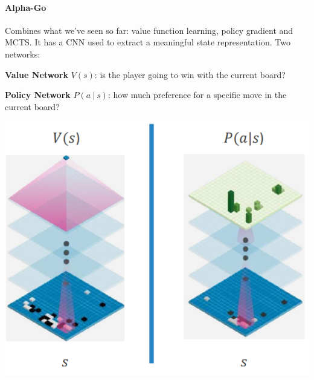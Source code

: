 \documentclass[10pt]{report}
\begin{document}
\paragraph{Alpha-Go} Combines what we've seen so far: value function learning, policy gradient and MCTS. It has a CNN used to extract a meaningful state representation.
Two networks:
\begin{list}{}{}
	\item \textbf{Value Network} $V(s)$: is the player going to win with the current board?
	\item \textbf{Policy Network} $P(a\:|\:s)$: how much preference for a specific move in the current board?
\end{list}
\begin{center}
	\includegraphics[scale=0.33]{207.png}
\end{center}
\end{document}
